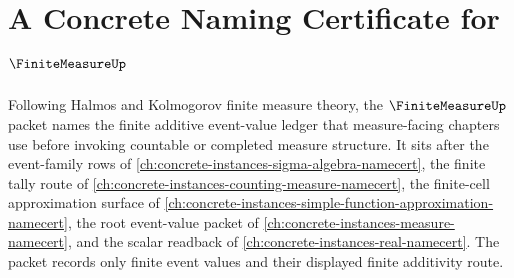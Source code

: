 \chapter{A Concrete Naming Certificate for $\FiniteMeasureUp$}
\label{ch:concrete-instances-finite-measure-namecert}

Following Halmos and Kolmogorov finite measure theory, the $\FiniteMeasureUp$ packet names the finite additive event-value ledger that measure-facing chapters use before invoking countable or completed measure structure. It sits after the event-family rows of \autoref{ch:concrete-instances-sigma-algebra-namecert}, the finite tally route of \autoref{ch:concrete-instances-counting-measure-namecert}, the finite-cell approximation surface of \autoref{ch:concrete-instances-simple-function-approximation-namecert}, the root event-value packet of \autoref{ch:concrete-instances-measure-namecert}, and the scalar readback of \autoref{ch:concrete-instances-real-namecert}. The packet records only finite event values and their displayed finite additivity route.

